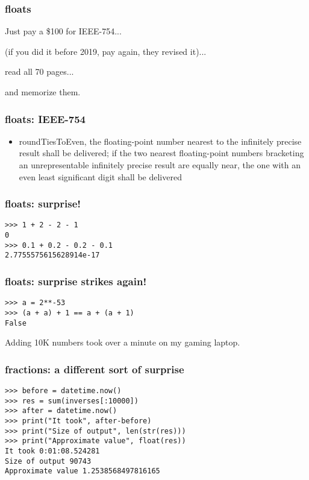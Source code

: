\begin{frame}[fragile]
\frametitle{floats}

Just pay a \$100 for IEEE-754...\pause

(if you did it before 2019, pay again, they revised it)...\pause

read all 70 pages...\pause

and memorize them.
\end{frame}

\begin{frame}[fragile]
\frametitle{floats: IEEE-754}

\begin{itemize}
\item roundTiesToEven, the floating-point number nearest to the
infinitely precise result shall be delivered;
if the two nearest floating-point numbers bracketing an unrepresentable
infinitely precise result are equally near,
the one with an even least significant digit shall be delivered
\end{itemize}

\end{frame}

\begin{frame}[fragile]
\frametitle{floats: surprise!}

\begin{lstlisting}
>>> 1 + 2 - 2 - 1
0
>>> 0.1 + 0.2 - 0.2 - 0.1
2.7755575615628914e-17
\end{lstlisting}

\end{frame}

\begin{frame}[fragile]
\frametitle{floats: surprise strikes again!}

\begin{lstlisting}
>>> a = 2**-53
>>> (a + a) + 1 == a + (a + 1)
False
\end{lstlisting}
\end{frame}

Adding 10K numbers took over a minute on my gaming laptop.

\begin{frame}[fragile]
\frametitle{fractions: a different sort of surprise}

\begin{lstlisting}
>>> before = datetime.now()
>>> res = sum(inverses[:10000])
>>> after = datetime.now()
>>> print("It took", after-before)
>>> print("Size of output", len(str(res)))
>>> print("Approximate value", float(res))
It took 0:01:08.524281
Size of output 90743
Approximate value 1.2538568497816165
\end{lstlisting}
\end{frame}

